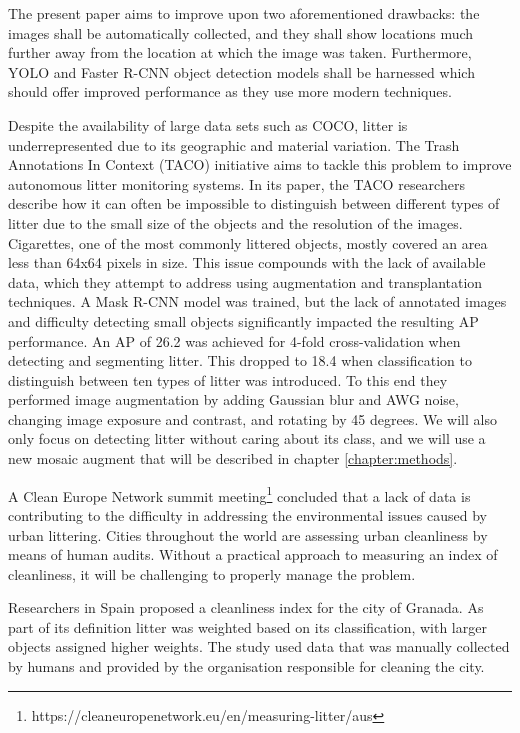 \documentclass{thesis}
\begin{document}
The present paper aims to improve upon two aforementioned drawbacks: the images shall be automatically collected, and they shall show locations much further away from the location at which the image was taken. Furthermore, YOLO and Faster R-CNN object detection models shall be harnessed which should offer improved performance as they use more modern techniques.

Despite the availability of large data sets such as COCO\cite{lin2015microsoft}, litter is underrepresented due to its geographic and material variation. The Trash Annotations In Context (TACO) initiative aims to tackle this problem to improve autonomous litter monitoring systems\cite{DBLP:journals/corr/abs-2003-06975}. In its paper, the TACO researchers describe how it can often be impossible to distinguish between different types of litter due to the small size of the objects and the resolution of the images. Cigarettes, one of the most commonly littered objects, mostly covered an area less than 64x64 pixels in size. This issue compounds with the lack of available data, which they attempt to address using augmentation and transplantation techniques. A Mask R-CNN model was trained, but the lack of annotated images and difficulty detecting small objects significantly impacted the resulting AP performance. An AP of 26.2 was achieved for 4-fold cross-validation when detecting and segmenting litter. This dropped to 18.4 when classification to distinguish between ten types of litter was introduced. To this end they performed image augmentation by adding Gaussian blur and AWG noise, changing image
exposure and contrast, and rotating by 45 degrees. We will also only focus on detecting litter without caring about its class, and we will use a new mosaic augment that will be described in chapter \ref{chapter:methods}.

A Clean Europe Network summit meeting\footnote{https://cleaneuropenetwork.eu/en/measuring-litter/aus} concluded that a lack of data is contributing to the difficulty in addressing the environmental issues caused by urban littering. Cities throughout the world are assessing urban cleanliness by means of human audits. Without a practical approach to measuring an index of cleanliness, it will be challenging to properly manage the problem. 

Researchers in Spain proposed a cleanliness index for the city of Granada\cite{sevilla}. As part of its definition litter was weighted based on its classification, with larger objects assigned higher weights. The study used data that was manually collected by humans and provided by the organisation responsible for cleaning the city.
\end{document}

